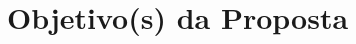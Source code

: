 \documentclass[11pt,oneside,brazil,hidelinks,article,sumario=tradicional,a4paper]{abntex2}
\begin{document}


\section{Objetivo(s) da Proposta}\label{sec:objs}
\end{document}
